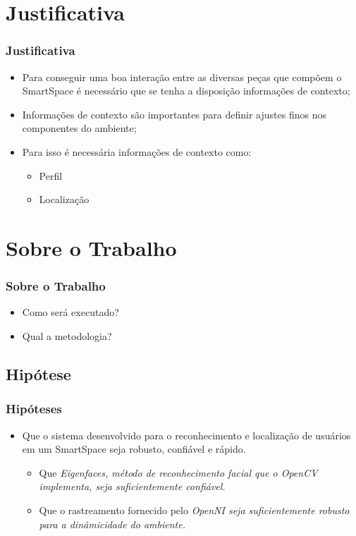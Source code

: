 \documentclass{beamer}
\begin{document}
\section{Justificativa} 
\begin{frame}
    \frametitle{Justificativa}
    \begin{itemize}
      \item Para conseguir uma boa interação entre as diversas peças que compõem o SmartSpace é necessário que se tenha a disposição informações de contexto;
      \item Informações de contexto são importantes para definir ajustes finos nos componentes do ambiente;
      \item Para isso é necessária informações de contexto como:
	    \begin{itemize}
		\item Perfil
		\item Localização
	    \end{itemize}
    \end{itemize}
\end{frame}


\section{Sobre o Trabalho}
\begin{frame}
    \frametitle{Sobre o Trabalho}
    \begin{itemize}
        \item Como será executado?
        \item Qual a metodologia?
    \end{itemize}
\end{frame}

\subsection{Hipótese}
\begin{frame}
    \frametitle{Hipóteses}
    \begin{itemize}
      \item Que o sistema desenvolvido para o reconhecimento e localização de usuários em um SmartSpace seja robusto, confiável e rápido.
      \begin{itemize}
        \item Que \it{Eigenfaces}, método de reconhecimento facial que o \it{OpenCV} implementa, seja suficientemente confiável.
        \item Que o rastreamento fornecido pelo \it{OpenNI} seja suficientemente robusto para a dinâmicidade do ambiente.
      \end{itemize}
    \end{itemize}
\end{frame}
\end{document}
